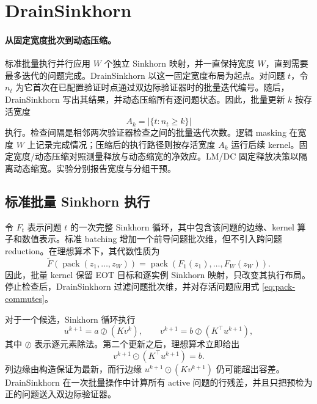 \section{DrainSinkhorn}
\label{sec:method}

\paragraph{从固定宽度批次到动态压缩。}
标准批量执行并行应用 $W$ 个独立 Sinkhorn 映射，并一直保持宽度 $W$，直到需要最多迭代的问题完成。DrainSinkhorn 以这一固定宽度布局为起点。对问题 $t$，令 $n_t$ 为它首次在已配置验证时点通过双边际验证器时的批量迭代编号。随后，DrainSinkhorn 写出其结果，并动态压缩所有逐问题状态。因此，批量更新 $k$ 按存活宽度
\[
A_k=\left|\{t:n_t\geq k\}\right|
\]
执行。检查间隔是相邻两次验证器检查之间的批量迭代次数。逻辑 masking 在宽度 $W$ 上记录完成情况；压缩后的执行路径则按存活宽度 $A_k$ 运行后续 kernel。固定宽度/动态压缩对照测量释放与动态缩宽的净效应。LM/DC 固定释放决策以隔离动态缩宽。实验分别报告宽度与分组干预。

\subsection{标准批量 Sinkhorn 执行}

令 $F_t$ 表示问题 $t$ 的一次完整 Sinkhorn 循环，其中包含该问题的边缘、kernel 算子和数值表示。标准 batching 增加一个前导问题批次维，但不引入跨问题 reduction。在理想算术下，其代数性质为
\begin{equation}
\widetilde F\!\left(\operatorname{pack}(z_1,\ldots,z_W)\right)
=\operatorname{pack}\!\left(F_1(z_1),\ldots,F_W(z_W)\right).
\label{eq:pack-commutes}
\end{equation}
因此，批量 kernel 保留 EOT 目标和逐实例 Sinkhorn 映射，只改变其执行布局。停止检查后，DrainSinkhorn 过滤问题批次维，并对存活问题应用式 \eqref{eq:pack-commutes}。

对于一个候选，Sinkhorn 循环执行
\begin{equation}
u^{k+1}=a\oslash(Kv^k),\qquad
v^{k+1}=b\oslash(K^\top u^{k+1}),
\label{eq:sinkhorn-cycle}
\end{equation}
其中 $\oslash$ 表示逐元素除法。第二个更新之后，理想算术立即给出
\begin{equation}
v^{k+1}\odot(K^\top u^{k+1})=b.
\label{eq:updated-marginal}
\end{equation}
列边缘由构造保证为最新，而行边缘 $u^{k+1}\odot(Kv^{k+1})$ 仍可能超出容差。DrainSinkhorn 在一次批量操作中计算所有 active 问题的行残差，并且只把预检为正的问题送入双边际验证器。

